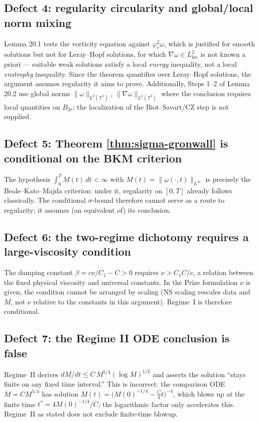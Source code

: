 \documentclass[11pt]{article}
\theoremstyle{definition}
\theoremstyle{remark}
\newcommand{\T}{\mathbb{T}}
\begin{document}
\subsection{Defect 4: regularity circularity and global/local norm mixing}
Lemma 20.1 tests the vorticity equation against $\varphi_r^2\omega$, which is
justified for smooth solutions but not for Leray--Hopf solutions, for which
$\nabla\omega \in L^2_{\mathrm{loc}}$ is not known a priori --- suitable weak
solutions satisfy a local \emph{energy} inequality, not a local
\emph{enstrophy} inequality. Since the theorem quantifies over Leray--Hopf
solutions, the argument assumes regularity it aims to prove. Additionally,
Steps 1--2 of Lemma 20.2 use global norms $\|\omega\|_{L^2(\T^3)}$,
$\|\nabla\omega\|_{L^2(\T^3)}$ where the conclusion requires local quantities
on $B_{2r}$; the localization of the Biot--Savart/CZ step is not supplied.

\subsection{Defect 5: Theorem \ref{thm:sigma-gronwall} is conditional on the BKM criterion}
The hypothesis $\int_0^T M(t)\,dt < \infty$ with
$M(t)=\|\omega(\cdot,t)\|_{L^\infty}$ is precisely the Beale--Kato--Majda
criterion: under it, regularity on $[0,T]$ already follows classically. The
conditional $\sigma$-bound therefore cannot serve as a route to regularity;
it assumes (an equivalent of) its conclusion.

\subsection{Defect 6: the two-regime dichotomy requires a large-viscosity condition}
The damping constant $\beta = c\nu/C_1 - C > 0$ requires $\nu > C_1 C/c$, a
relation between the fixed physical viscosity and universal constants. In the
Prize formulation $\nu$ is given; the condition cannot be arranged by scaling
(NS scaling rescales data and $M$, not $\nu$ relative to the constants in this
argument). Regime~I is therefore conditional.

\subsection{Defect 7: the Regime II ODE conclusion is false}
Regime~II derives $dM/dt \leq C\,M^{5/4}(\log M)^{1/2}$ and asserts the
solution ``stays finite on any fixed time interval.'' This is incorrect: the
comparison ODE $\dot{M} = C M^{5/4}$ has solution
$M(t) = \bigl(M(0)^{-1/4} - \tfrac{C}{4}t\bigr)^{-4}$, which blows up at the
finite time $t^* = 4 M(0)^{-1/4}/C$; the logarithmic factor only accelerates
this. Regime~II as stated does not exclude finite-time blowup.
\end{document}
